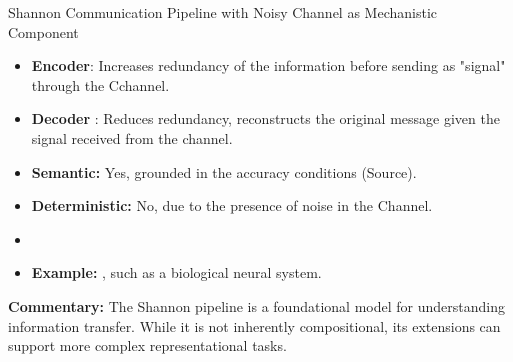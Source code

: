 \documentclass[10pt, aspectratio=169]{beamer}
\begin{document}
\begin{frame}[label=shannon_noisy]{Shannon Communication Pipeline with Noisy Channel as Mechanistic Component}
\begin{itemize}
                    \item \textbf{Encoder}: Increases redundancy of the information before sending as "signal" through the Cchannel.
                    \item \textbf{Decoder }: Reduces redundancy, reconstructs the original message given the signal received from the channel.
                    \item \textbf{Semantic:} Yes, grounded in the accuracy conditions (Source).
                    \item \textbf{Deterministic:} No, due to the presence of noise in the Channel.
                    \item 
                    \item \textbf{Example:} , such as a biological neural system.
                \end{itemize}

                \vspace{0.5cm}
                \textbf{Commentary:} The Shannon pipeline is a foundational model for understanding information transfer. While it is not inherently compositional, its extensions can support more complex representational tasks.
        \end{frame}
\end{document}
